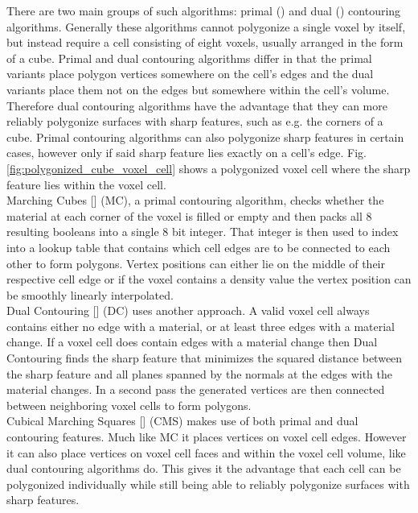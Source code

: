There are two main groups of such algorithms: primal () and dual () contouring algorithms.
Generally these algorithms cannot polygonize a single voxel by itself, but instead require a cell consisting of eight voxels, usually arranged in the form
of a cube. Primal and dual contouring algorithms differ in that the primal variants place polygon vertices somewhere on the cell's edges and the dual variants
place them not on the edges but somewhere within the cell's volume. Therefore dual contouring algorithms have the advantage that they can more reliably polygonize
surfaces with sharp features, such as e.g. the corners of a cube. Primal contouring algorithms can also polygonize sharp features in certain cases, however only
if said sharp feature lies exactly on a cell's edge. Fig. \ref{fig:polygonized_cube_voxel_cell} shows a polygonized voxel cell where the sharp feature lies within
the voxel cell.\\
Marching Cubes [] (MC), a primal contouring algorithm, checks whether the material at each corner of the voxel is filled or empty and then 
packs all 8 resulting booleans into a single 8 bit integer. That integer is then used to index into a lookup table that contains which cell edges are to be connected to
each other to form polygons. Vertex positions can either lie on the middle of their respective cell edge or if the voxel contains a density value the vertex position
can be smoothly linearly interpolated.\\
Dual Contouring [] (DC) uses another approach. A valid voxel cell always contains either no edge with a material, or at least three edges with a material change. If a voxel cell
does contain edges with a material change then Dual Contouring finds the sharp feature that minimizes the squared distance between the sharp feature and all planes spanned
by the normals at the edges with the material changes. In a second pass the generated vertices are then connected between neighboring voxel cells to form polygons.\\
Cubical Marching Squares [] (CMS) makes use of both primal and dual contouring features. Much like MC it places vertices on voxel cell edges. However it can also place vertices
on voxel cell faces and within the voxel cell volume, like dual contouring algorithms do. This gives it the advantage that each cell can be polygonized individually while still being able to
reliably polygonize surfaces with sharp features.

